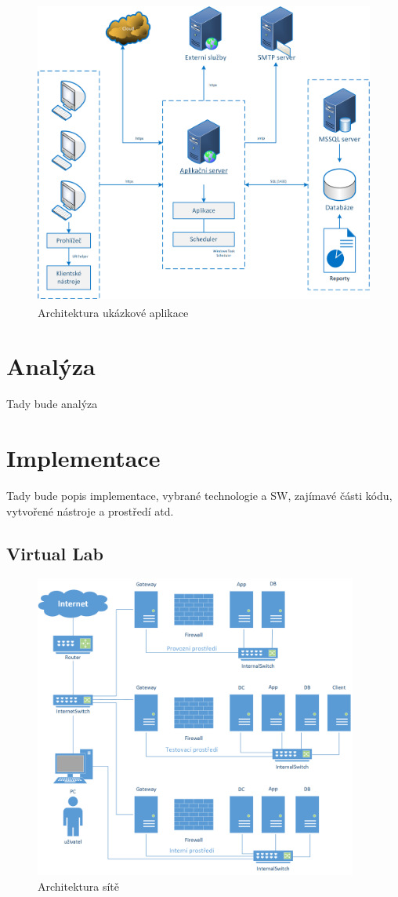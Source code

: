\begin{figure}[]
  \centering
  \includegraphics[height=10cm]{fig/app_architektura.png}
  \caption{Architektura ukázkové aplikace}
  \label{fig:architektura}
\end{figure}

\section{Analýza}
Tady bude analýza

\section{Implementace}
Tady bude popis implementace, vybrané technologie a SW, zajímavé části kódu, vytvořené nástroje a prostředí atd.

\subsection{Virtual Lab}
\begin{figure}[]
  \centering
  \includegraphics[height=10cm]{fig/network.png}
  \caption{Architektura sítě}
  \label{fig:architekturasite}
\end{figure}

